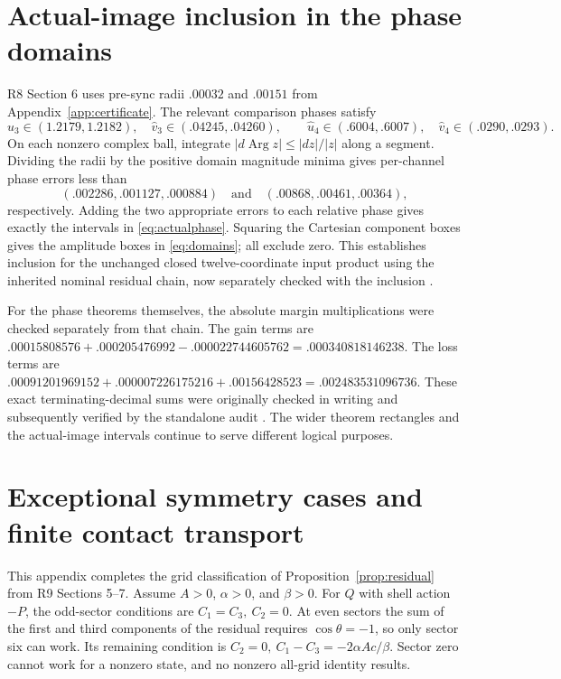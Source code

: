 \documentclass[11pt,a4paper]{article}
\numberwithin{equation}{section}
\newcommand{\Arg}{\operatorname{Arg}}
\begin{document}
\section{Actual-image inclusion in the phase domains}\label{app:inclusion}
R8 Section 6 uses pre-sync radii $.00032$ and $.00151$ from
Appendix~\ref{app:certificate}. The relevant comparison phases satisfy
\[
\widehat u_3\in(1.2179,1.2182),\quad
\widehat v_3\in(.04245,.04260),\qquad
\widehat u_4\in(.6004,.6007),\quad
\widehat v_4\in(.0290,.0293).
\]
On each nonzero complex ball, integrate
$|d\Arg z|\leq |dz|/|z|$ along a segment. Dividing the radii by the positive
domain magnitude minima gives per-channel phase errors less than
\[
(.002286,.001127,.000884)\quad\text{and}\quad
(.00868,.00461,.00364),
\]
respectively. Adding the two appropriate errors to each relative phase gives
exactly the intervals in \eqref{eq:actualphase}. Squaring the Cartesian
component boxes gives the amplitude boxes in \eqref{eq:domains}; all exclude
zero. This establishes inclusion for the unchanged closed twelve-coordinate
input product using the inherited nominal residual chain, now separately checked with the inclusion \cite{Audit,GPTAudit}.

For the phase theorems themselves, the absolute margin multiplications
were checked separately from that chain. The gain terms are
$ .00015808576+.000205476992-.000022744605762
=.000340818146238$.
The loss terms are
$ .00091201969152+.000007226175216+.00156428523
=.002483531096736$.
These exact terminating-decimal sums were originally checked in writing
and subsequently verified by the standalone audit \cite{Audit}.
The wider theorem rectangles and the actual-image intervals continue
to serve different logical purposes.

\section{Exceptional symmetry cases and finite contact transport}\label{app:residualcases}
This appendix completes the grid classification of
Proposition~\ref{prop:residual} from R9 Sections 5--7.
Assume $A>0$, $\alpha>0$, and $\beta>0$.
For $Q$ with shell action $-P$, the odd-sector conditions are
$C_1=C_3,\ C_2=0$. At even sectors the sum of the first and third
components of the residual requires $\cos\theta=-1$, so only sector six
can work. Its remaining condition is
$C_2=0,\ C_1-C_3=-2\alpha Ac/\beta$.
Sector zero cannot work for a nonzero state, and no nonzero all-grid
identity results.
\end{document}
